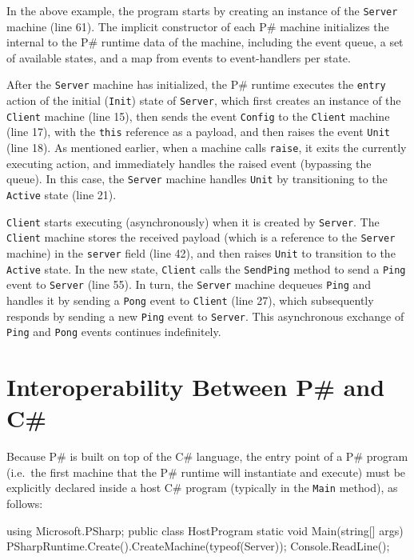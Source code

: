 \documentclass{llncs}
\newcommand{\ps}{P\#\xspace}
\newcommand{\cs}{C\#\xspace}
\begin{document}
\noindent
In the above example, the program starts by creating an instance of the \texttt{Server} machine (line 61). The implicit constructor of each \ps machine initializes the internal to the \ps runtime data of the machine, including the event queue, a set of available states, and a map from events to event-handlers per state.

After the \texttt{Server} machine has initialized, the \ps runtime executes the \texttt{entry} action of the initial (\texttt{Init}) state of \texttt{Server}, which first creates an instance of the \texttt{Client} machine (line 15), then sends the event \texttt{Config} to the \texttt{Client} machine (line 17), with the \texttt{this} reference as a payload, and then raises the event \texttt{Unit} (line 18). As mentioned earlier, when a machine calls \texttt{raise}, it exits the currently executing action, and immediately handles the raised event (bypassing the queue). In this case, the \texttt{Server} machine handles \texttt{Unit} by transitioning to the \texttt{Active} state (line 21).

\texttt{Client} starts executing (asynchronously) when it is created by \texttt{Server}. The \texttt{Client} machine stores the received payload (which is a reference to the \texttt{Server} machine) in the \texttt{server} field (line 42), and then raises \texttt{Unit} to transition to the \texttt{Active} state. In the new state, \texttt{Client} calls the \texttt{SendPing} method to send a \texttt{Ping} event to \texttt{Server} (line 55). In turn, the \texttt{Server} machine dequeues \texttt{Ping} and handles it by sending a \texttt{Pong} event to \texttt{Client} (line 27), which subsequently responds by sending a new \texttt{Ping} event to \texttt{Server}. This asynchronous exchange of \texttt{Ping} and \texttt{Pong} events continues indefinitely.

\section{Interoperability Between \ps and \cs}
\label{sec:interop}

Because \ps is built on top of the \cs language, the entry point of a \ps program (i.e.\ the first machine that the \ps runtime will instantiate and execute) must be explicitly declared inside a host \cs program (typically in the \texttt{Main} method), as follows:

\begin{psharpNoLines}
using Microsoft.PSharp;
public class HostProgram {
  static void Main(string[] args) {
    PSharpRuntime.Create().CreateMachine(typeof(Server));
    Console.ReadLine();
  }
}
\end{psharpNoLines}
\end{document}
